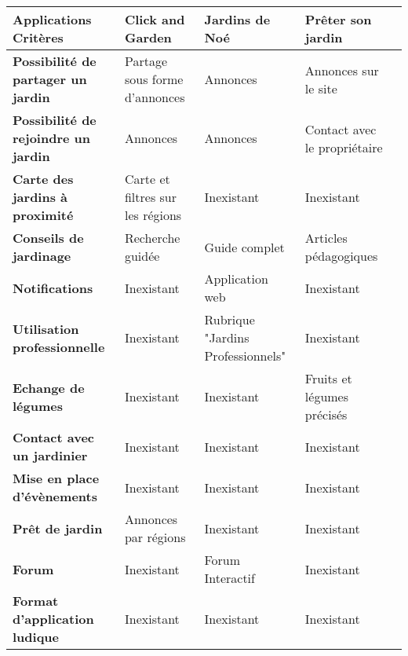 \documentclass{report}
\begin{document}
\begin{tabular}{|p{3cm}|p{3cm}|p{3cm}|p{3cm}|p{3cm}|}
    \hline
    \textbf{Applications Critères} & \textbf{Click and Garden} & \textbf{Jardins de Noé} & \textbf{Prêter son jardin} 
    \\ \hline
    \textbf{Possibilité de partager un jardin} & Partage sous forme d’annonces & Annonces & Annonces sur le site
    \\ \hline
   \textbf{Possibilité de rejoindre un jardin} & Annonces & Annonces & Contact avec le propriétaire  
    \\ \hline
   \textbf{Carte des jardins à proximité} & Carte et filtres sur les régions & Inexistant & Inexistant
    \\ \hline
   \textbf{Conseils de jardinage} & Recherche guidée & Guide complet & Articles pédagogiques
    \\ \hline
    \textbf{Notifications} & Inexistant & Application web & Inexistant 
    \\ \hline
    \textbf{Utilisation professionnelle} & Inexistant & Rubrique "Jardins Professionnels" & Inexistant
    \\ \hline
    \textbf{Echange de légumes} & Inexistant & Inexistant & Fruits et légumes précisés
    \\ \hline
    \textbf{Contact avec un jardinier} & Inexistant & Inexistant & Inexistant  
    \\ \hline
    \textbf{Mise en place d’évènements} & Inexistant & Inexistant & Inexistant
    \\ \hline
    \textbf{Prêt de jardin} & Annonces par régions & Inexistant & Inexistant
    \\ \hline
    \textbf{Forum} & Inexistant & Forum Interactif & Inexistant 
    \\ \hline
    \textbf{Format d'application ludique} & Inexistant & Inexistant & Inexistant 
    \\ \hline
\end{tabular}
\end{document}
